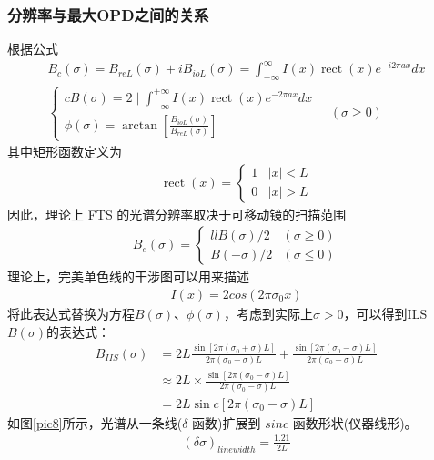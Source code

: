 \documentclass[conference]{IEEEtran}
\begin{document}
\subsubsection{分辨率与最大OPD之间的关系}
根据公式
\begin{align}
    B_{c}(\sigma)=B_{r e L}(\sigma)+i B_{i o L}(\sigma)=\int_{-\infty}^{\infty} I(x) \operatorname{rect}(x) e^{-i 2 \pi a x} d x \\
    \begin{cases}{c}
        B(\sigma)=2 \mid \int_{-\infty}^{+\infty} I(x) \operatorname{rect}(x) e^{-2 \pi a x} d x \\
        \phi(\sigma)=\arctan \left[\frac{B_{i o L}(\sigma)}{B_{r e L}(\sigma)}\right]
    \end{cases} \quad(\sigma \geq 0)
\end{align}
其中矩形函数定义为
\begin{align*}
    \operatorname{rect}(x)=\begin{cases}
        1 & |x|<L \\
        0 & |x|>L
        \end{cases}
\end{align*}
因此，理论上 FTS 的光谱分辨率取决于可移动镜的扫描范围
\begin{align}
    B_{e}(\sigma)=\begin{cases}{ll}
        B(\sigma) / 2 & (\sigma \geq 0) \\
        B(-\sigma) / 2 & (\sigma \leq 0)
        \end{cases}
\end{align}
理论上，完美单色线的干涉图可以用来描述
\begin{align}
    I(x) = 2cos(2\pi \sigma_0 x)
\end{align}
将此表达式替换为方程$B(\sigma)$、$\phi(\sigma)$，考虑到实际上$\sigma > 0$，可以得到ILS $B(\sigma)$的表达式：
\begin{align}
        B_{I I S}(\sigma)
        &=2 L\frac{\sin \left[2 \pi\left(\sigma_{0}+\sigma\right) L\right]}{2 \pi\left(\sigma_{0}+\sigma\right) L}+\frac{\sin \left[2 \pi\left(\sigma_{0}-\sigma\right) L\right]}{2 \pi\left(\sigma_{0}-\sigma\right) L} \\
        & \approx 2 L \times \frac{\sin \left[2 \pi\left(\sigma_{0}-\sigma\right) L\right]}{2 \pi\left(\sigma_{0}-\sigma\right) L}  \\
        & =2 L \sin c\left[2 \pi\left(\sigma_{0}-\sigma\right) L\right]
\end{align}
如图\ref{pic8}所示，光谱从一条线($\delta$ 函数)扩展到 $sin c$ 函数形状(仪器线形)。
\begin{align}
    (\delta \sigma)_{linewidth} = \frac{1.21}{2L}
\end{align}
\end{document}
